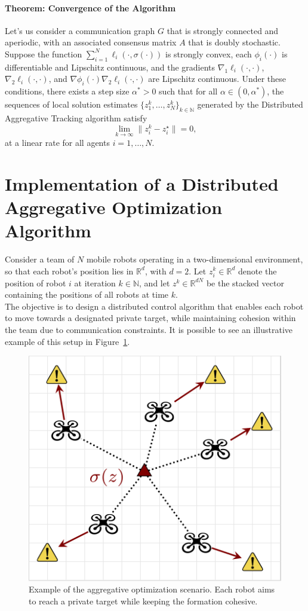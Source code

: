 \paragraph{Theorem: Convergence of the Algorithm} 
\label{th:aggregative}
Let's us consider a communication graph \(G\) that is strongly connected and aperiodic, with an associated consensus matrix \(A\) that is doubly stochastic. Suppose the function \(\sum_{i=1}^N \ell_i(\cdot, \sigma(\cdot))\) is strongly convex, each \(\phi_i(\cdot)\) is differentiable and Lipschitz continuous, and the gradients \(\nabla_1 \ell_i(\cdot, \cdot)\), \(\nabla_2 \ell_i(\cdot, \cdot)\), and \(\nabla \phi_i(\cdot) \nabla_2 \ell_i(\cdot, \cdot)\) are Lipschitz continuous. Under these conditions, there exists a step size \(\alpha^* > 0\) such that for all \(\alpha \in (0, \alpha^*)\), the sequences of local solution estimates \(\{ z_1^k, \ldots, z_N^k \}_{k \in \mathbb{N}}\) generated by the Distributed Aggregative Tracking algorithm satisfy
\[
\lim_{k \to \infty} \| z_i^k - z_i^\star \| = 0,
\]
at a linear rate for all agents \(i = 1, \ldots, N\).

\section{Implementation of a Distributed Aggregative Optimization Algorithm}

Consider a team of \(N\) mobile robots operating in a two-dimensional environment, so that each robot's position lies in \(\mathbb{R}^d\), with $d=2$. Let \(z_i^k \in \mathbb{R}^d\) denote the position of robot \(i\) at iteration \(k \in \mathbb{N}\), and let \(z^k \in \mathbb{R}^{dN}\) be the stacked vector containing the positions of all robots at time \(k\). \\
The objective is to design a distributed control algorithm that enables each robot to move towards a designated private target, while maintaining cohesion within the team due to communication constraints. It is possible to see an illustrative example of this setup in Figure~\ref{fig:aggregative_opt_scenario}.

\begin{figure}[h!]
    \centering
    \includegraphics[width=0.3\linewidth]{figs/aggregative_opt_scenario.png}
    \caption{Example of the aggregative optimization scenario. Each robot aims to reach a private target while keeping the formation cohesive.}
    \label{fig:aggregative_opt_scenario}
\end{figure}

